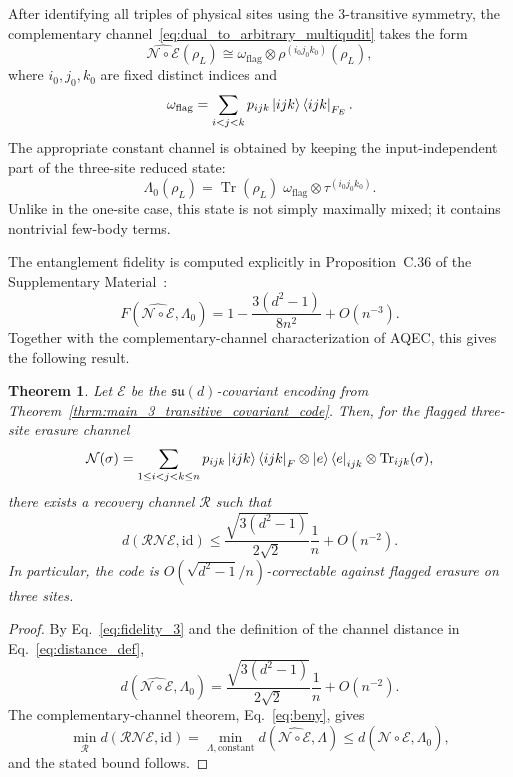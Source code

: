 \documentclass[10pt,twocolumn,superscriptaddress,aps,amsmath,amssymb,citeautoscript,floatfix,prx,longbibliography]{revtex4-2}
\newtheorem{theorem}{Theorem}
\theoremstyle{plain}
\theoremstyle{plain}
\theoremstyle{plain}
\theoremstyle{plain}
\theoremstyle{plain}
\theoremstyle{plain}
\begin{document}
After identifying all triples of physical sites using the $3$-transitive symmetry, the complementary channel~\eqref{eq:dual_to_arbitrary_multiqudit} takes the form
$$
\widehat{\mathcal N\circ\mathcal E}(\rho_L)
\cong
\omega_{\mathrm{flag}}
\otimes
\rho^{(i_0j_0k_0)}(\rho_L),
$$
where $i_0,j_0,k_0$ are fixed distinct indices and
$$
\omega_{\mathrm{flag}}
=
\sum_{i<j<k}
p_{ijk}
\ket{ijk}\bra{ijk}_{F_E}.
$$
The appropriate constant channel is obtained by keeping the input-independent part of the three-site reduced state:
$$
\Lambda_0(\rho_L)
=
\operatorname{Tr}(\rho_L)\;
\omega_{\mathrm{flag}}
\otimes
\tau^{(i_0j_0k_0)} .
$$
Unlike in the one-site case, this state is not simply maximally mixed; it contains nontrivial few-body terms.

The entanglement fidelity is computed explicitly in Proposition~C.36 of the Supplementary Material~\cite{SuppMat}:
\begin{equation}\label{eq:fidelity_3}
F\left(\widehat{\mathcal N\circ\mathcal E},\Lambda_0\right)
=
1
-
\frac{3(d^2-1)}{8n^2}
+
O(n^{-3}) .
\end{equation}
Together with the complementary-channel characterization of AQEC, this gives the following result.

\begin{theorem}
Let $\mathcal E$ be the $\mathfrak{su}(d)$-covariant encoding from Theorem~\ref{thrm:main_3_transitive_covariant_code}. Then, for the flagged three-site erasure channel
$$
\mathcal N(\sigma)
=
\sum_{1\le i<j<k\le n}
p_{ijk}
\ket{ijk}\bra{ijk}_F
\otimes
\ket e\bra e_{ijk}
\otimes
\operatorname{Tr}_{ijk}(\sigma),
$$
there exists a recovery channel $\mathcal R$ such that
$$
d(\mathcal R\mathcal N\mathcal E,\mathrm{id})
\le
\frac{\sqrt{3(d^2-1)}}{2\sqrt 2}
\frac1n
+
O(n^{-2}) .
$$
In particular, the code is $O(\sqrt{d^2-1}/n)$-correctable against flagged erasure on three sites.
\end{theorem}

\begin{proof}
By Eq.~\eqref{eq:fidelity_3} and the definition of the channel distance in Eq.~\eqref{eq:distance_def},
$$
d\left(\widehat{\mathcal N\circ\mathcal E},\Lambda_0\right)
=
\frac{\sqrt{3(d^2-1)}}{2\sqrt 2}
\frac1n
+
O(n^{-2}) .
$$
The complementary-channel theorem, Eq.~\eqref{eq:beny}, gives
$$
\min_{\mathcal R}
d(\mathcal R\mathcal N\mathcal E,\mathrm{id})
=
\min_{\Lambda,\mathrm{constant}}
d\left(\widehat{\mathcal N\circ\mathcal E},\Lambda\right)
\le
d\left(\widehat{\mathcal N\circ\mathcal E},\Lambda_0\right),
$$
and the stated bound follows.
\end{proof}
\end{document}
